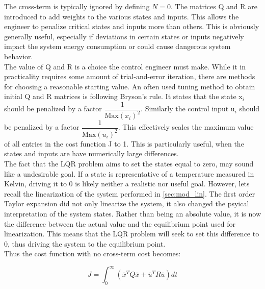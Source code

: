The cross-term is typically ignored by defining $N=0$. The matrices Q and R are introduced to add weights to the various states and inputs. This allows the engineer to penalize critical states and inputs more than others. This is obviously generally useful, especially if deviations in certain states or inputs negatively impact the system energy consumption or could cause dangerous system behavior.\\

The value of Q and R is a choice the control engineer must make. While it in practicality requires some amount of trial-and-error iteration, there are methods for choosing a reasonable starting value. An often used tuning method to obtain initial Q and R matrices is following Bryson's rule. It states that the state x$_{\textit{i}}$ should be penalized by a factor $\dfrac{1}{\text{Max} \left(x_{\textit{i}}\right)^2}$. Similarly the control input u$_{\textit{i}}$ should be penalized by a factor $\dfrac{1}{\text{Max} \left(u_{\textit{i}}\right)^2}$. This effectively scales the maximum value of all entries in the cost function J to 1. This is particularly useful, when the states and inputs are have numerically large differences.\\


The fact that the LQR problem aims to set the states equal to zero, may sound like a undesirable goal. If a state is representative of a temperature measured in Kelvin, driving it to 0 is likely neither a realistic nor useful goal. However, lets recall the linearization of the system performed in \cref{sec:mod_lin}. The first order Taylor expansion did not only linearize the system, it also changed the psyical interpretation of the system states. Rather than being an absolute value, it is now the difference between the actual value and the equilibrium point used for linearization. This means that the LQR problem will seek to set this difference to 0, thus driving the system to the equilibrium point.\\

Thus the cost function with no cross-term cost becomes:

\begin{equation} \label{eq:lqr_cost_fcn}
	J = \int_0^{\infty} \left( \bar{x}^TQ\bar{x} + \bar{u}^TR\bar{u} \right)dt
\end{equation}

